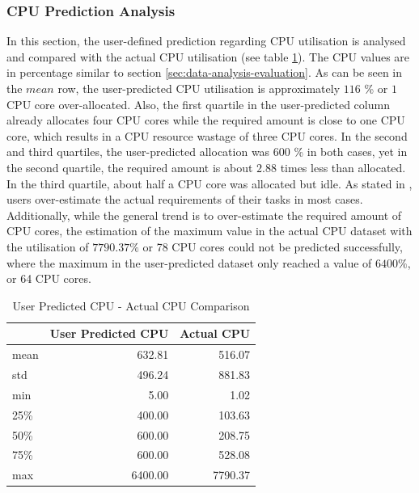       \subsubsection{CPU Prediction Analysis}
      \label{sec:user-defined-cpu-prediction-analysis}

        In this section, the user-defined prediction regarding CPU utilisation is analysed and compared with the actual CPU utilisation (see table \ref{tab:user-predicted-cpu-comparison}).
        The CPU values are in percentage similar to section \ref{sec:data-analysis-evaluation}.
        As can be seen in the $mean$ row, the user-predicted CPU utilisation is approximately $116$ \% or $1$ CPU core over-allocated. 
        Also, the first quartile in the user-predicted column already allocates four CPU cores while the required amount is close to one CPU core, which results in a CPU resource wastage of three CPU cores.
        In the second and third quartiles, the user-predicted allocation was 600 \% in both cases, yet in the second quartile, the required amount is about $2.88$ times less than allocated.
        In the third quartile, about half a CPU core was allocated but idle.
        As stated in \cite{thonglekImprovingResourceUtilization2019}, users over-estimate the actual requirements of their tasks in most cases.
        Additionally, while the general trend is to over-estimate the required amount of CPU cores, the estimation of the maximum value in the actual CPU dataset with the utilisation of $7790.37 \%$ or 78 CPU cores could not be predicted successfully, where the maximum in the user-predicted dataset only reached a value of $6400\%$, or 64 CPU cores.
        \begin{table}
          \centering
          \caption{User Predicted CPU - Actual CPU Comparison}
          \label{tab:user-predicted-cpu-comparison}

          \begin{tabular}{|l|rr|}
            \toprule
            {} &  User Predicted CPU &  Actual CPU \\
            \midrule
            mean       &         632.81 &     516.07 \\
            std        &         496.24 &     881.83 \\
            min        &           5.00 &       1.02 \\
            25\%        &         400.00 &     103.63 \\
            50\%        &         600.00 &     208.75 \\
            75\%        &         600.00 &     528.08 \\
            max        &        6400.00 &    7790.37 \\
            \bottomrule
            \end{tabular}
        \end{table}
